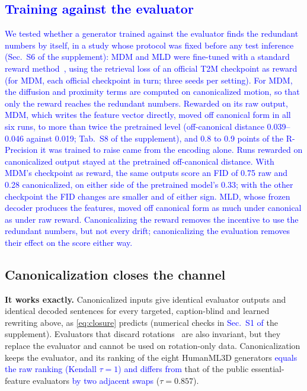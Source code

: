 \documentclass[10pt,twocolumn,letterpaper]{article}
\newcommand{\new}[1]{\textcolor{blue}{#1}}%
\begin{document}
\subsection{\new{Training against the evaluator}}\label{sec:training}
\new{We tested whether a generator trained against the evaluator finds the redundant numbers by itself, in a study whose protocol was fixed before any test inference (Sec.~S6 of the supplement): MDM and MLD were fine-tuned with a standard reward method~\cite{xu2023imagereward,draft2024}, using the retrieval loss of an official T2M checkpoint as reward (for MDM, each official checkpoint in turn; three seeds per setting). For MDM, the diffusion and proximity terms are computed on canonicalized motion, so that only the reward reaches the redundant numbers. Rewarded on its raw output, MDM, which writes the feature vector directly, moved off canonical form in all six runs, to more than twice the pretrained level (off-canonical distance 0.039--0.046 against 0.019; Tab.~S8 of the supplement), and 0.8 to 0.9 points of the R-Precision it was trained to raise came from the encoding alone. Runs rewarded on canonicalized output stayed at the pretrained off-canonical distance. With MDM's checkpoint as reward, the same outputs score an FID of 0.75 raw and 0.28 canonicalized, on either side of the pretrained model's 0.33; with the other checkpoint the FID changes are smaller and of either sign. MLD, whose frozen decoder produces the features, moved off canonical form as much under canonical as under raw reward. Canonicalizing the reward removes the incentive to use the redundant numbers, but not every drift; canonicalizing the evaluation removes their effect on the score either way.}

\subsection{Canonicalization closes the channel}
\textbf{It works exactly.} Canonicalized inputs give identical evaluator outputs and identical decoded sentences for every targeted, caption-blind and learned rewriting above, as \cref{eq:closure} predicts (numerical checks in \new{Sec.~S1 of} the supplement). Evaluators that discard rotations~\cite{mardm2025} are also invariant, but they replace the evaluator and cannot be used on rotation-only data. Canonicalization keeps the evaluator, and its ranking of the eight HumanML3D generators \new{equals the raw ranking (Kendall $\tau=1$) and differs from} that of the public essential-feature evaluators \new{by two adjacent swaps} ($\tau=0.857$).
\end{document}
